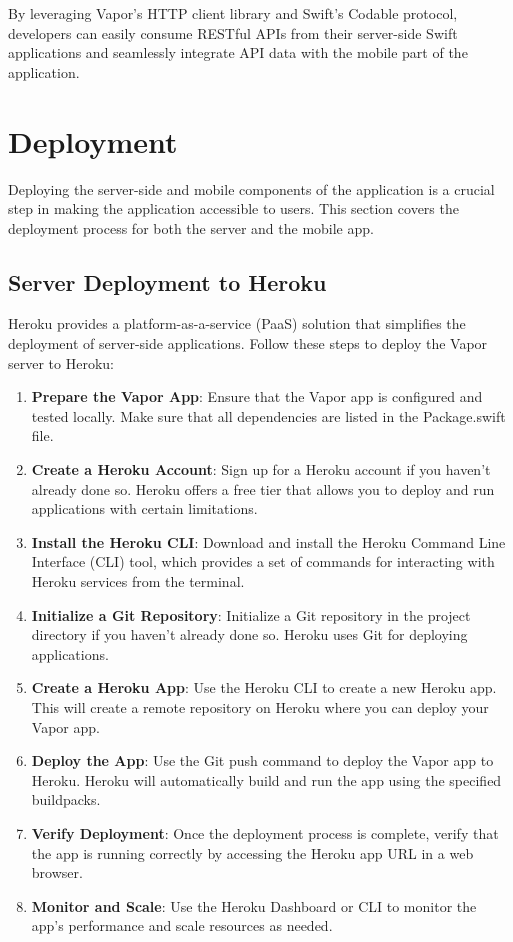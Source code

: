 \documentclass[
  biblatex,
  language=english,
  figures=false,
  sourcecodes,
  glossaries,
  index
]{kidiplom}
\begin{document}
By leveraging Vapor's HTTP client library and Swift's Codable protocol, developers can easily consume RESTful APIs from their server-side Swift applications and seamlessly integrate API data with the mobile part of the application.

\section{Deployment}

Deploying the server-side and mobile components of the application is a crucial step in making the application accessible to users. This section covers the deployment process for both the server and the mobile app.

\subsection{Server Deployment to Heroku}

Heroku provides a platform-as-a-service (PaaS) solution that simplifies the deployment of server-side applications. Follow these steps to deploy the Vapor server to Heroku:

\begin{enumerate}
    \item \textbf{Prepare the Vapor App}: Ensure that the Vapor app is configured and tested locally. Make sure that all dependencies are listed in the Package.swift file.
    
    \item \textbf{Create a Heroku Account}: Sign up for a Heroku account if you haven't already done so. Heroku offers a free tier that allows you to deploy and run applications with certain limitations.
    
    \item \textbf{Install the Heroku CLI}: Download and install the Heroku Command Line Interface (CLI) tool, which provides a set of commands for interacting with Heroku services from the terminal.
    
    \item \textbf{Initialize a Git Repository}: Initialize a Git repository in the project directory if you haven't already done so. Heroku uses Git for deploying applications.
    
    \item \textbf{Create a Heroku App}: Use the Heroku CLI to create a new Heroku app. This will create a remote repository on Heroku where you can deploy your Vapor app.
    
    \item \textbf{Deploy the App}: Use the Git push command to deploy the Vapor app to Heroku. Heroku will automatically build and run the app using the specified buildpacks.
    
    \item \textbf{Verify Deployment}: Once the deployment process is complete, verify that the app is running correctly by accessing the Heroku app URL in a web browser.
    
    \item \textbf{Monitor and Scale}: Use the Heroku Dashboard or CLI to monitor the app's performance and scale resources as needed.
\end{enumerate}
\end{document}

